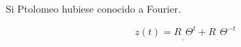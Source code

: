 \documentclass[preview]{standalone}
\begin{document}
\begin{center}
Si Ptolomeo  hubiese conocido a Fourier.

$$z(t)=  R_{_{_+}} \Theta^{t} +R_{_{_-}} \Theta^{-t}$$
\end{center}
\end{document}
